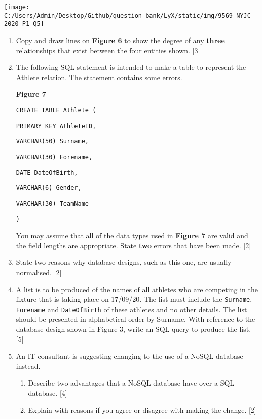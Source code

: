 \begin{center}
\texttt{[image: C:/Users/Admin/Desktop/Github/question\_bank/LyX/static/img/9569-NYJC-2020-P1-Q5]}
\par\end{center}
\begin{enumerate}
\item Copy and draw lines on \textbf{Figure 6} to show the degree of any
\textbf{three} relationships that exist between the four entities
shown. {[}3{]}
\item The following SQL statement is intended to make a table to represent
the Athlete relation. The statement contains some errors. 
\noindent \begin{center}
\textbf{Figure 7}
\par\end{center}

\noindent %
\noindent\begin{minipage}[t]{1\columnwidth}%
\texttt{CREATE TABLE Athlete ( }

\texttt{\qquad{}PRIMARY KEY AthleteID, }

\texttt{\qquad{}VARCHAR(50) Surname, }

\texttt{\qquad{}VARCHAR(30) Forename, }

\texttt{\qquad{}DATE DateOfBirth, }

\texttt{\qquad{}VARCHAR(6) Gender, }

\texttt{\qquad{}VARCHAR(30) TeamName }

\texttt{) }%
\end{minipage}

You may assume that all of the data types used in \textbf{Figure 7}
are valid and the field lengths are appropriate. State \textbf{two}
errors that have been made. \hfill{}{[}2{]}
\item State two reasons why database designs, such as this one, are usually
normalised. \hfill{}{[}2{]}
\item A list is to be produced of the names of all athletes who are competing
in the fixture that is taking place on 17/09/20. The list must include
the \texttt{Surname}, \texttt{Forename} and \texttt{DateOfBirth} of
these athletes and no other details. The list should be presented
in alphabetical order by Surname. With reference to the database design
shown in Figure 3, write an SQL query to produce the list. \hfill{}{[}5{]}
\item An IT consultant is suggesting changing to the use of a NoSQL database
instead.
\begin{enumerate}
\item Describe two advantages that a NoSQL database have over a SQL database.
\hfill{} {[}4{]}
\item Explain with reasons if you agree or disagree with making the change.
\hfill{}{[}2{]}
\end{enumerate}
\end{enumerate}